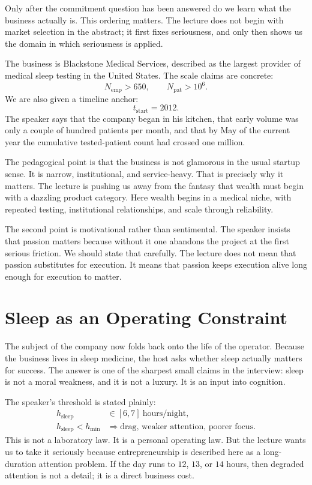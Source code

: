 Only after the commitment question has been answered do we learn what the business actually is. This ordering matters. The lecture does not begin with market selection in the abstract; it first fixes seriousness, and only then shows us the domain in which seriousness is applied.

The business is Blackstone Medical Services, described as the largest provider of medical sleep testing in the United States. The scale claims are concrete:
\begin{equation}
N_{\text{emp}} > 650, \qquad N_{\text{pat}} > 10^6.
\end{equation}
We are also given a timeline anchor:
\begin{equation}
t_{\text{start}} = 2012.
\end{equation}
The speaker says that the company began in his kitchen, that early volume was only a couple of hundred patients per month, and that by May of the current year the cumulative tested-patient count had crossed one million.

The pedagogical point is that the business is not glamorous in the usual startup sense. It is narrow, institutional, and service-heavy. That is precisely why it matters. The lecture is pushing us away from the fantasy that wealth must begin with a dazzling product category. Here wealth begins in a medical niche, with repeated testing, institutional relationships, and scale through reliability.

The second point is motivational rather than sentimental. The speaker insists that passion matters because without it one abandons the project at the first serious friction. We should state that carefully. The lecture does not mean that passion substitutes for execution. It means that passion keeps execution alive long enough for execution to matter.

\section{Sleep as an Operating Constraint}

The subject of the company now folds back onto the life of the operator. Because the business lives in sleep medicine, the host asks whether sleep actually matters for success. The answer is one of the sharpest small claims in the interview: sleep is not a moral weakness, and it is not a luxury. It is an input into cognition.

The speaker’s threshold is stated plainly:
\begin{align}
h_{\text{sleep}} &\in [6,7]\ \text{hours/night}, \\
h_{\text{sleep}} < h_{\min} &\Rightarrow \text{drag, weaker attention, poorer focus}.
\end{align}
This is not a laboratory law. It is a personal operating law. But the lecture wants us to take it seriously because entrepreneurship is described here as a long-duration attention problem. If the day runs to \(12\), \(13\), or \(14\) hours, then degraded attention is not a detail; it is a direct business cost.

